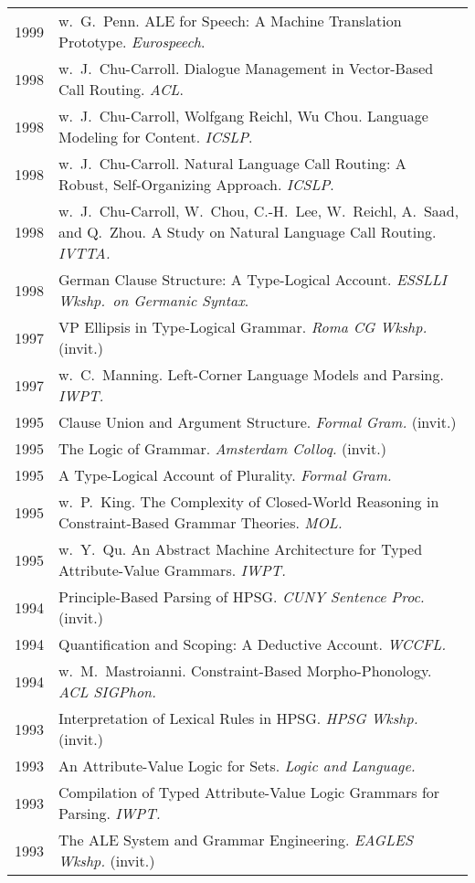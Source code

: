 \documentclass[10pt]{paper}
\newcommand{\publ}[2]{#1 & \begin{minipage}[t]{0.9\textwidth}#2\end{minipage}\\[4pt]}
\begin{document}
\begin{tabular}{ll}
\publ{1999}{w.\ G.~Penn. ALE for Speech: A Machine Translation Prototype. {\sl\sffamily Eurospeech}.}
\publ{1998}{w.\ J.~Chu-Carroll. Dialogue Management in Vector-Based Call Routing. {\sl\sffamily ACL}.}
\publ{1998}{w.\ J.~Chu-Carroll, Wolfgang Reichl, Wu Chou. Language Modeling for Content. {\sl\sffamily ICSLP}.}
\publ{1998}{w.\ J.~Chu-Carroll. Natural Language Call Routing: A Robust, Self-Organizing Approach. {\sl\sffamily ICSLP}.}
\publ{1998}{w.\ J.~Chu-Carroll, W.~Chou, C.-H.~Lee, W.~Reichl, A.~Saad, and Q.~Zhou. A Study on Natural Language Call Routing. {\sl\sffamily IVTTA.}\vspace{6pt}}
\publ{1998}{German Clause Structure: A Type-Logical Account. {\sl\sffamily ESSLLI Wkshp.\ on Germanic Syntax}.}
\publ{1997}{VP Ellipsis in Type-Logical Grammar. {\sl\sffamily Roma CG Wkshp.} (invit.)}
\publ{1997}{w.\ C.~Manning. Left-Corner Language Models and Parsing. {\sl\sffamily IWPT.}}
\publ{1995}{Clause Union and Argument Structure. {\sl\sffamily Formal Gram.} (invit.)}
\publ{1995}{The Logic of Grammar. {\sl\sffamily Amsterdam Colloq.} (invit.)}
\publ{1995}{A Type-Logical Account of Plurality. {\sl\sffamily Formal Gram.}}
\publ{1995}{w.\ P.~King. The Complexity of Closed-World Reasoning in Constraint-Based Grammar Theories. {\sl\sffamily MOL.}}
\publ{1995}{w.\ Y.~Qu. An Abstract Machine Architecture for Typed Attribute-Value Grammars. {\sl\sffamily IWPT.}}
\publ{1994}{Principle-Based Parsing of HPSG. {\sl\sffamily CUNY Sentence Proc.} (invit.)}
\publ{1994}{Quantification and Scoping: A Deductive Account. {\sl\sffamily WCCFL.}}
\publ{1994}{w.\ M.~Mastroianni. Constraint-Based Morpho-Phonology. {\sl\sffamily ACL SIGPhon.}}
\publ{1993}{Interpretation of Lexical Rules in HPSG. {\sl\sffamily HPSG Wkshp.} (invit.)}
\publ{1993}{An Attribute-Value Logic for Sets. {\sl\sffamily Logic and Language.}}
\publ{1993}{Compilation of Typed Attribute-Value Logic Grammars for Parsing. {\sl\sffamily IWPT.}}
\publ{1993}{The ALE System and Grammar Engineering. {\sl\sffamily EAGLES Wkshp.} (invit.)}
\end{tabular}
\end{document}
